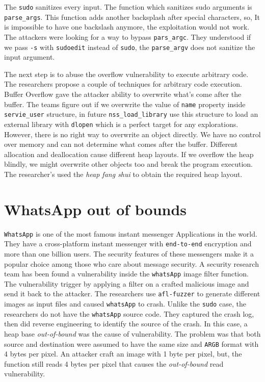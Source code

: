 \documentclass{masterthesis}
\begin{document}
The \lstinline{sudo} sanitizes every input. The function which sanitizes sudo arguments is \lstinline{parse_args}. This function adds another backsplash after special characters, so, It is impossible to have one backslash anymore, the exploitation would not work. The attackers were looking for a way to bypass \lstinline{pars_argc}. They understood if we pass \lstinline{-s} with \lstinline{sudoedit} instead of \lstinline{sudo}, the \lstinline{parse_argv} does not sanitize the input argument.

The next step is to abuse the overflow vulnerability to execute arbitrary code. The researchers propose a couple of techniques for arbitrary code execution. Buffer Overflow gave the attacker ability to overwrite what's come after the buffer. The teams figure out if we overwrite the value of \lstinline{name} property inside \lstinline{servie_user} structure, in future \lstinline{nss_load_library} use this structure to load an external library with \lstinline{dlopen} which is a perfect target for any explorations. However, there is no right way to overwrite an object directly. We have no control over memory and can not determine what comes after the buffer. Different allocation and deallocation cause different heap layouts. If we overflow the heap blindly, we might overwrite other objects too and break the program execution. The researcher's used the \emph{heap fang shui} to obtain the required heap layout.

\section{WhatsApp out of bounds}
\label{sect:whatsappexp}
\lstinline{WhatsApp} is one of the most famous instant messenger Applications in the world. They have a cross-platform instant messenger with \lstinline{end-to-end} encryption and more than one billion users. The security features of these messengers make it a popular choice among those who care about message security.
A security research team has been found a vulnerability inside the \lstinline{whatsApp} image filter function. The vulnerability trigger by applying a filter on a crafted malicious image and send it back to the attacker. The researchers use \lstinline{afl-fuzzer} to generate different images as input files and caused \lstinline{whatsApp} to crash. Unlike the \lstinline{sudo} case, the researchers do not have the \lstinline{whatsApp} source code. They captured the crash log, then did reverse engineering to identify the source of the crash. In this case, a heap base \emph{out-of-bound} was the cause of vulnerability. The problem was that both source and destination were assumed to have the same size and \lstinline{ARGB} format with 4 bytes per pixel. An attacker craft an image with 1 byte per pixel, but, the function still reads 4 bytes per pixel that causes the \emph{out-of-bound} read vulnerability.
\end{document}
